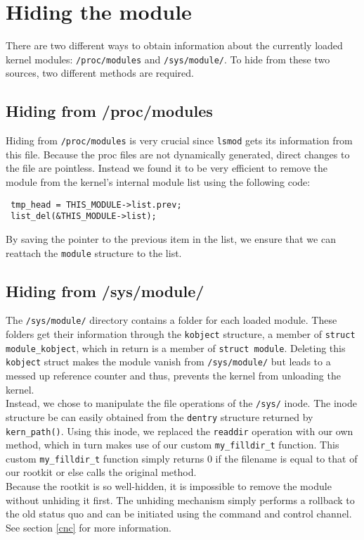 \section{Hiding the module}
There are two different ways to obtain information about the currently loaded 
kernel modules: \texttt{/proc/modules} and \texttt{/sys/module/}. To hide from 
these two sources, two different methods are required.
\subsection{Hiding from /proc/modules}
Hiding from \texttt{/proc/modules} is very crucial since \texttt{lsmod} gets 
its information from this file. Because the proc files are not dynamically 
generated, direct changes to the file are pointless. Instead we found it to be 
very efficient to remove the module from the kernel's internal module list 
using the following code:
\begin{lstlisting}
 tmp_head = THIS_MODULE->list.prev;
 list_del(&THIS_MODULE->list);	
\end{lstlisting}
By saving the pointer to the previous item in the list, we ensure that we can 
reattach the \texttt{module} structure to the list.

\subsection{Hiding from /sys/module/}
The \texttt{/sys/module/} directory contains a folder for each loaded module. 
These folders get their information through the \texttt{kobject} structure, a 
member of \texttt{struct module\_kobject}, which in return is a member of 
\texttt{struct module}. Deleting this \texttt{kobject} struct makes the module 
vanish from \texttt{/sys/module/} but leads to a messed up reference counter 
and thus, prevents the kernel from unloading the kernel.\\
Instead, we chose to manipulate the file operations of the \texttt{/sys/} 
inode. The inode structure be can easily obtained from the \texttt{dentry} 
structure returned by \texttt{kern\_path()}. Using this inode, we 
replaced the \texttt{readdir} operation with our own method, which in turn 
makes use of 
our custom \texttt{my\_filldir\_t} function. This custom 
\texttt{my\_filldir\_t} function simply returns 0 if 
the filename is equal to that of our rootkit or else calls the original 
method.\newline
\hfill\\
Because the rootkit is so well-hidden, it is impossible to remove the module 
without unhiding it first. The unhiding mechanism simply performs a rollback to 
the old status quo and can be initiated using the command and control channel. 
See section \ref{cnc} for more information.

